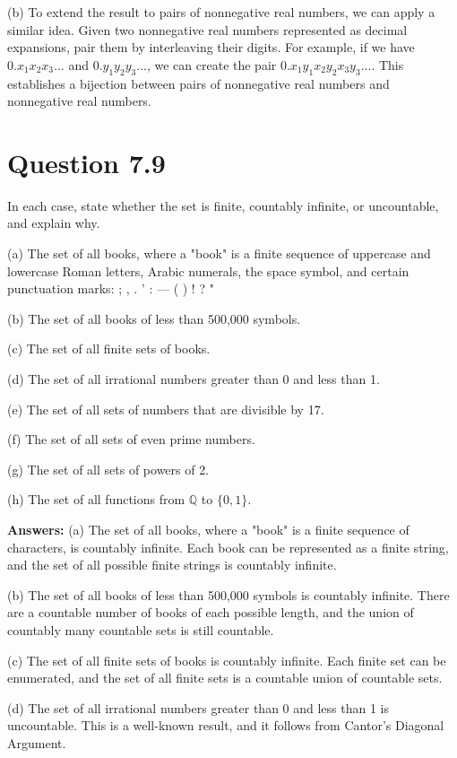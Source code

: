 \documentclass{article}
\begin{document}
(b) To extend the result to pairs of nonnegative real numbers, we can apply a similar idea. Given two nonnegative real numbers represented as decimal expansions, pair them by interleaving their digits. For example, if we have $0.x_1x_2x_3...$ and $0.y_1y_2y_3...$, we can create the pair $0.x_1y_1x_2y_2x_3y_3...$. This establishes a bijection between pairs of nonnegative real numbers and nonnegative real numbers.

\section*{Question 7.9}
In each case, state whether the set is finite, countably infinite, or uncountable, and explain why.

(a) The set of all books, where a "book" is a finite sequence of uppercase and lowercase Roman letters, Arabic numerals, the space symbol, and certain punctuation marks: ; , . ' : — ( ) ! ? "

(b) The set of all books of less than 500,000 symbols.

(c) The set of all finite sets of books.

(d) The set of all irrational numbers greater than 0 and less than 1.

(e) The set of all sets of numbers that are divisible by 17.

(f) The set of all sets of even prime numbers.

(g) The set of all sets of powers of 2.

(h) The set of all functions from $\mathbb{Q}$ to $\{0, 1\}$.

\textbf{Answers:}
(a) The set of all books, where a "book" is a finite sequence of characters, is countably infinite. Each book can be represented as a finite string, and the set of all possible finite strings is countably infinite.

(b) The set of all books of less than 500,000 symbols is countably infinite. There are a countable number of books of each possible length, and the union of countably many countable sets is still countable.

(c) The set of all finite sets of books is countably infinite. Each finite set can be enumerated, and the set of all finite sets is a countable union of countable sets.

(d) The set of all irrational numbers greater than 0 and less than 1 is uncountable. This is a well-known result, and it follows from Cantor's Diagonal Argument.
\end{document}
